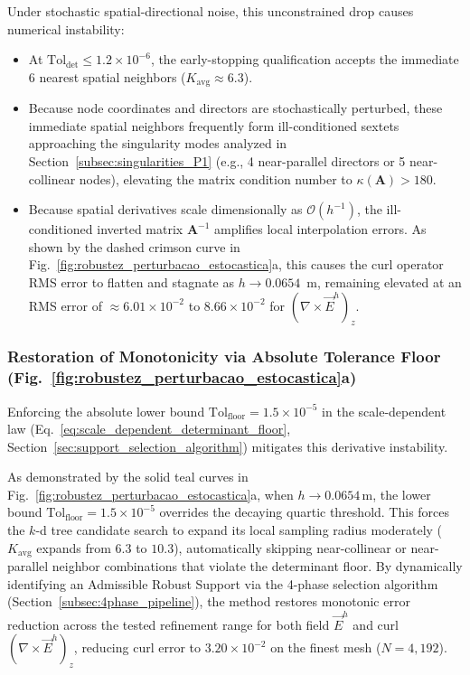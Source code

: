 \documentclass[preprint,12pt]{elsarticle}
\begin{document}
Under stochastic spatial-directional noise, this unconstrained drop causes numerical instability:
\begin{itemize}
    \item At $\mathrm{Tol}_{\mathrm{det}} \le 1.2 \times 10^{-6}$, the early-stopping qualification accepts the immediate 6 nearest spatial neighbors ($K_{\mathrm{avg}} \approx 6.3$).
    \item Because node coordinates and directors are stochastically perturbed, these immediate spatial neighbors frequently form ill-conditioned sextets approaching the singularity modes analyzed in Section~\ref{subsec:singularities_P1} (e.g., 4 near-parallel directors or 5 near-collinear nodes), elevating the matrix condition number to $\kappa(\mathbf{A}) > 180$.
    \item Because spatial derivatives scale dimensionally as $\mathcal{O}(h^{-1})$, the ill-conditioned inverted matrix $\mathbf{A}^{-1}$ amplifies local interpolation errors. As shown by the dashed crimson curve in Fig.~\ref{fig:robustez_perturbacao_estocastica}a, this causes the curl operator RMS error to flatten and stagnate as $h \to 0.0654$~m, remaining elevated at an RMS error of $\approx 6.01 \times 10^{-2}$ to $8.66 \times 10^{-2}$ for $(\nabla \times \vec{E}^h)_z$.
\end{itemize}

\subsubsection{Restoration of Monotonicity via Absolute Tolerance Floor (Fig.~\ref{fig:robustez_perturbacao_estocastica}a)}
\label{subsubsec:restoration_via_floor}

Enforcing the absolute lower bound $\mathrm{Tol}_{\mathrm{floor}} = 1.5 \times 10^{-5}$ in the scale-dependent law (Eq.~\eqref{eq:scale_dependent_determinant_floor}, Section~\ref{sec:support_selection_algorithm}) mitigates this derivative instability.

As demonstrated by the solid teal curves in Fig.~\ref{fig:robustez_perturbacao_estocastica}a, when $h \to 0.0654$\,m, the lower bound $\mathrm{Tol}_{\mathrm{floor}} = 1.5 \times 10^{-5}$ overrides the decaying quartic threshold. This forces the $k$-d tree candidate search to expand its local sampling radius moderately ($K_{\mathrm{avg}}$ expands from $6.3$ to $10.3$), automatically skipping near-collinear or near-parallel neighbor combinations that violate the determinant floor. By dynamically identifying an Admissible Robust Support via the 4-phase selection algorithm (Section~\ref{subsec:4phase_pipeline}), the method restores monotonic error reduction across the tested refinement range for both field $\vec{E}^h$ and curl $(\nabla \times \vec{E}^h)_z$, reducing curl error to $3.20 \times 10^{-2}$ on the finest mesh ($N = 4{,}192$).
\end{document}
